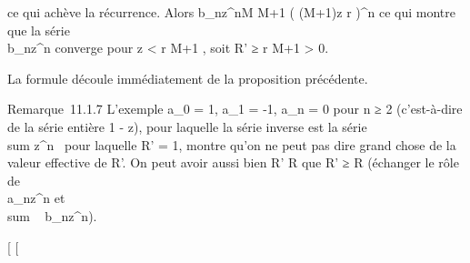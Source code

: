 \documentclass[]{article}
\begin{document}
ce qui achève la récurrence. Alors
b_nz^n\leq M \over
M+1 \left ( (M+1)z
\over r \right )^n ce qui
montre que la série \\\sum
 b_nz^n converge pour z
\textless{} r \over M+1 , soit R' ≥ r
\over M+1 \textgreater{} 0.

La formule découle immédiatement de la proposition précédente.

Remarque~11.1.7 L'exemple a_0 = 1, a_1 = -1,
a_n = 0 pour n ≥ 2 (c'est-à-dire de la série entière 1 - z),
pour laquelle la série inverse est la série
\\sum  z^n~
pour laquelle R' = 1, montre qu'on ne peut pas dire grand chose de la
valeur effective de R'. On peut avoir aussi bien R' \leq R que R' ≥ R
(échanger le rôle de \\\sum
 a_nz^n et
\\sum ~
b_nz^n).

{[}
{[}
\end{document}
